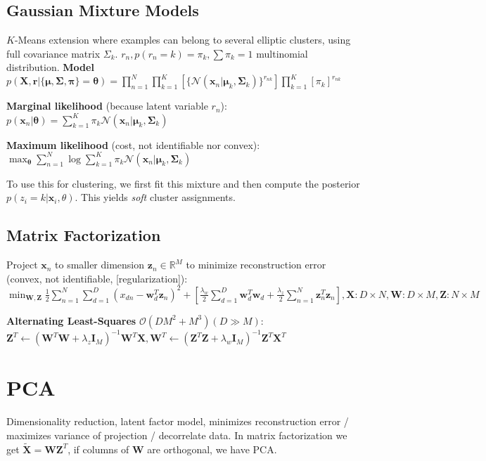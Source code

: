 \documentclass[10pt,a4paper,landscape]{article}
\renewcommand{\bf}[1]{\ensuremath{\mathbf{#1}}}
\begin{document}
\begin{multicols*}{4}
\subsection{Gaussian Mixture Models}
$K$-Means extension where examples can belong to several elliptic clusters, using full covariance matrix $\Sigma_k$. $r_n, p(r_n=k)=\pi_k, \sum \pi_k = 1$ multinomial distribution.
\textbf{Model} $p(\bf{X}, \bf{r} | \{\bf{\mu}, \bf{\Sigma}, \bf{\pi}\} = \bf{\theta}) = \prod\limits_{n=1}^N \prod\limits_{k=1}^K [\{\mathcal{N}(\bf{x}_n | \bf{\mu}_k , \bf{\Sigma}_k ) \}^{r_{nk}}] \prod\limits_{k=1}^K [\pi_k]^{r_{nk}}$

\textbf{Marginal likelihood} (because latent variable $r_n$): $p(\bf{x}_n | \bf{\theta}) = \sum_{k=1}^K \pi_k \mathcal{N}(\bf{x}_n | \bf{\mu}_k, \bf{\Sigma}_k)$

\textbf{Maximum likelihood} (cost, not identifiable nor convex): $\max_{\bf{\theta}} \sum_{n=1}^N \log \sum_{k=1}^K \pi_k \mathcal{N} ( \bf{x}_n | \bf{\mu}_k , \bf{\Sigma}_k)$

To use this for clustering, we first fit this mixture and then compute the posterior $p(z_i = k | \bf{x}_i, \theta)$. This yields \textit{soft} cluster assignments.

\subsection{Matrix Factorization}

Project $\bf{x}_n$ to smaller dimension $\bf{z}_n \in \mathbb{R}^M$ to minimize reconstruction error (convex, not identifiable, [regularization]): $\min_{\bf{W, Z}} \frac{1}{2} \sum_{n=1}^N \sum_{d=1}^D (x_{dn} - \bf{w}_d^T \bf{z}_n )^2 
+ [\frac{\lambda_w}{2} \sum_{d=1}^D \bf{w}_d^T \bf{w}_d + \frac{\lambda_z}{2} \sum_{n=1}^N \bf{z}_n^T \bf{z}_n], 
\bf{X}: D \times N, \bf{W}: D \times M, \bf{Z}: N \times M$

\textbf{Alternating Least-Squares} $\mathcal{O}(DM^2 + M^3) (D \gg M)$: $\bf{Z}^T \leftarrow (\bf{W}^T \bf{W} + \lambda_z \bf{I}_M )^{-1} \bf{W}^T \bf{X},
\bf{W}^T \leftarrow (\bf{Z}^T \bf{Z} + \lambda_w \bf{I}_M )^{-1} \bf{Z}^T \bf{X}^T$

\section{PCA}
Dimensionality reduction, latent factor model, minimizes reconstruction error / maximizes variance of projection / decorrelate data. In matrix factorization we get $\bf{\tilde{X}} = \bf{WZ}^T$, if columns of $\bf{W}$ are orthogonal, we have PCA.


\end{multicols*}
\end{document}
